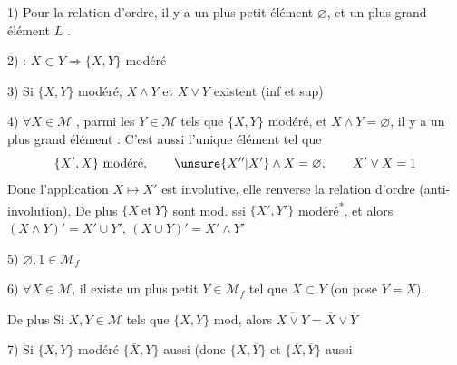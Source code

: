 
1) Pour la relation d'ordre, il y a un plus petit élément $\varnothing$, et un plus grand élément $L$ .

2) : $X\subset Y\Rightarrow\{X,Y\}$ modéré

3) Si $\{X,Y\}$ modéré, $X\wedge Y$ et $X\vee Y$ existent (inf et sup)

  

4)  $\forall X\in\mathcal M$ ,  parmi les $Y\in\mathcal M$ tels que $\{X,Y\}$ modéré, et $X\wedge Y=\varnothing$, il y a un plus grand élément . C'est aussi l'unique élément tel que
\[
\{X',X\}\text{ modéré},\qquad \unsure{X''|X'}\wedge X=\varnothing,\qquad X'\vee X=1
\]
Donc l'application $X\mapsto X'$ est involutive, elle renverse la relation d'ordre (anti-involution),  De plus $\{X\ \mathrm{et}\ Y\}$ sont mod. ssi $\{X',Y'\}$ modéré\textsuperscript{*},
et alors \quad $(X\wedge Y)'=X'\cup Y'$, \quad $(X\cup Y)'=X'\wedge Y'$

5) $\varnothing,1\in\mathcal M_f$

6) $\forall X\in\mathcal M$, il existe un plus petit  $Y\in\mathcal M_f$ tel que $X\subset Y$ (on pose $Y=\bar X$).

De plus Si $X,Y\in\mathcal M$ tels que $\{X,Y\}$ mod, alors $\overline{X\vee Y}=\overline X\vee\overline Y$

7) Si $\{X,Y\}$ modéré $\{\overline X,Y\}$ aussi (donc $\{X,\overline Y\}$ et $\{\overline X,\overline Y\}$ aussi
